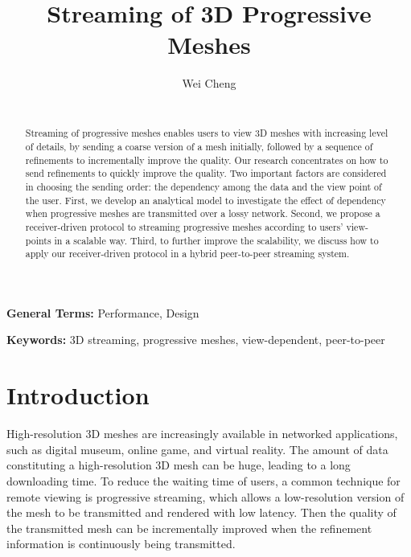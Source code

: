 \documentclass{sig-alt-release2}
\title{Streaming of 3D Progressive Meshes}
\author{\alignauthor Wei Cheng\\
\affaddr{School of Computing,National University of Singapore}\\
\email{chengwe2@comp.nus.edu.sg}}
\begin{document}
\maketitle
\begin{abstract}
Streaming of progressive meshes enables users to view
3D meshes with increasing level of details, by
sending a coarse version of a mesh initially, 
followed by a sequence of
refinements to incrementally improve the quality. 
Our research concentrates on how to 
send refinements to quickly improve the quality. 
Two important factors are considered in choosing the sending order:
the dependency among the data and the view point of the user. 
First, we develop an analytical model to 
investigate the effect of dependency
when progressive meshes are transmitted over a lossy network. 
Second, we propose a receiver-driven protocol to streaming
progressive meshes according to users' view-points  
in a scalable way. 
Third, to further improve the scalability, 
we discuss how to apply our receiver-driven protocol 
in a hybrid peer-to-peer streaming system. 
\end{abstract}

\vspace{1mm}
\noindent
{\bf General Terms:} Performance, Design

\vspace{1mm}
\noindent
{\bf Keywords:} 3D streaming, progressive meshes, view-dependent, peer-to-peer
\section{Introduction}
    High-resolution 3D meshes are increasingly available in networked
    applications, such as digital museum, online game, and virtual reality.
    The amount of data constituting a high-resolution 3D mesh can be
    huge, leading to a long downloading time. 
    To reduce the waiting time of users, %
    a common technique for remote viewing is progressive streaming,
    which allows a low-resolution version of the mesh to be transmitted
    and rendered with low latency. Then the quality of the transmitted 
    mesh can be incrementally improved when the refinement information
    is continuously being transmitted.
\end{document}

